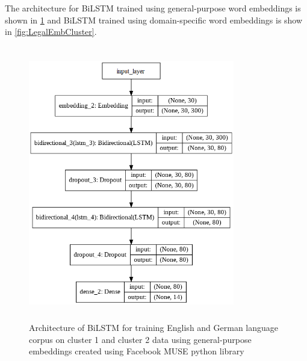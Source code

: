 The architecture for \gls{BiLSTM} trained using general-purpose word embeddings is shown in \ref{fig:FBMuseCluster} and \gls{BiLSTM} trained using domain-specific word embeddings is show in \ref{fig:LegalEmbCluster}.

\begin{figure}[!ht]
    \centering
    \includegraphics[width=9cm, height=12cm]{pics/FBMUSE_Untrained_cluster_1.png}
    \captionsetup{justification=centering,margin=1cm}
    \caption{Architecture of \gls{BiLSTM} for training English and German language corpus on cluster 1 and cluster 2 data using general-purpose embeddings created using Facebook MUSE python library}
    \label{fig:FBMuseCluster}
\end{figure}



